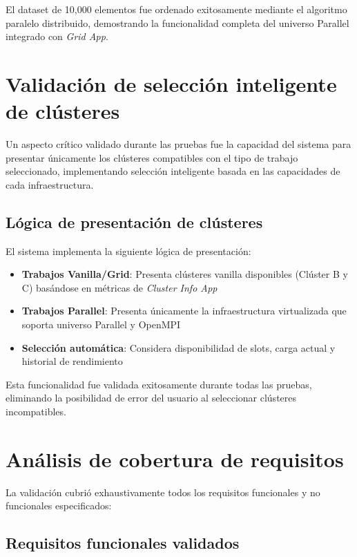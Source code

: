El dataset de 10,000 elementos fue ordenado exitosamente mediante el algoritmo paralelo distribuido, demostrando la funcionalidad completa del universo Parallel integrado con \textit{Grid App}.

\section{Validación de selección inteligente de clústeres}
\noindent

Un aspecto crítico validado durante las pruebas fue la capacidad del sistema para presentar únicamente los clústeres compatibles con el tipo de trabajo seleccionado, implementando selección inteligente basada en las capacidades de cada infraestructura.

\subsection{Lógica de presentación de clústeres}
\noindent

El sistema implementa la siguiente lógica de presentación:

\begin{itemize}
	\item \textbf{Trabajos Vanilla/Grid}: Presenta clústeres vanilla disponibles (Clúster B y C) basándose en métricas de \textit{Cluster Info App}
	\item \textbf{Trabajos Parallel}: Presenta únicamente la infraestructura virtualizada que soporta universo Parallel y OpenMPI
	\item \textbf{Selección automática}: Considera disponibilidad de slots, carga actual y historial de rendimiento
\end{itemize}

Esta funcionalidad fue validada exitosamente durante todas las pruebas, eliminando la posibilidad de error del usuario al seleccionar clústeres incompatibles.

\section{Análisis de cobertura de requisitos}
\noindent

La validación cubrió exhaustivamente todos los requisitos funcionales y no funcionales especificados:

\subsection{Requisitos funcionales validados}
\noindent


